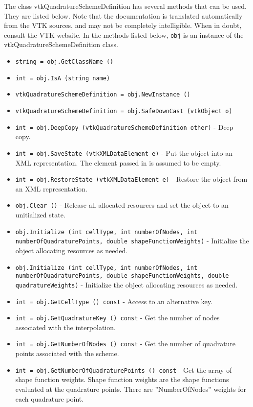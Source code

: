 The class vtkQuadratureSchemeDefinition has several methods that can be used.
  They are listed below.
Note that the documentation is translated automatically from the VTK sources,
and may not be completely intelligible.  When in doubt, consult the VTK website.
In the methods listed below, \verb|obj| is an instance of the vtkQuadratureSchemeDefinition class.
\begin{itemize}
\item  \verb|string = obj.GetClassName ()|

\item  \verb|int = obj.IsA (string name)|

\item  \verb|vtkQuadratureSchemeDefinition = obj.NewInstance ()|

\item  \verb|vtkQuadratureSchemeDefinition = obj.SafeDownCast (vtkObject o)|

\item  \verb|int = obj.DeepCopy (vtkQuadratureSchemeDefinition other)| -  Deep copy.

\item  \verb|int = obj.SaveState (vtkXMLDataElement e)| -  Put the object into an XML representation. The element
 passed in is assumed to be empty.

\item  \verb|int = obj.RestoreState (vtkXMLDataElement e)| -  Restore the object from an XML representation.

\item  \verb|obj.Clear ()| -  Release all allocated resources and set the 
 object to an unitialized state.

\item  \verb|obj.Initialize (int cellType, int numberOfNodes, int numberOfQuadraturePoints, double shapeFunctionWeights)| -  Initialize the object allocating resources as needed.

\item  \verb|obj.Initialize (int cellType, int numberOfNodes, int numberOfQuadraturePoints, double shapeFunctionWeights, double quadratureWeights)| -  Initialize the object allocating resources as needed.

\item  \verb|int = obj.GetCellType () const| -  Access to an alternative key.

\item  \verb|int = obj.GetQuadratureKey () const| -  Get the number of nodes associated with the interpolation.

\item  \verb|int = obj.GetNumberOfNodes () const| -  Get the number of quadrature points associated with the scheme.

\item  \verb|int = obj.GetNumberOfQuadraturePoints () const| -  Get the array of shape function weights. Shape function weights are
 the shape functions evaluated at the quadrature points. There are 
 ''NumberOfNodes'' weights for each quadrature point.

\end{itemize}
